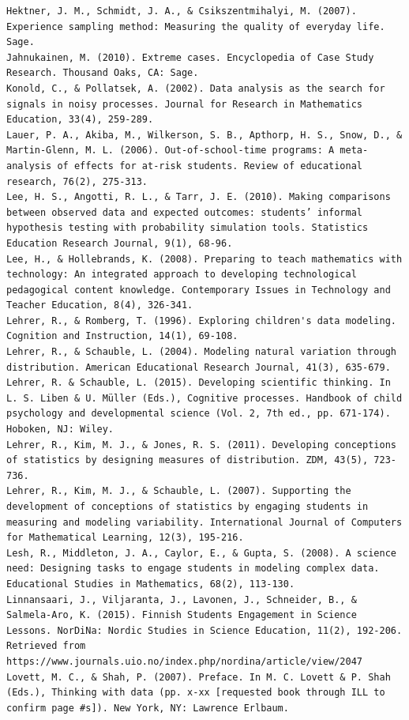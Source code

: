 \documentclass[]{book}
\theoremstyle{definition}
\theoremstyle{definition}
\theoremstyle{definition}
\theoremstyle{remark}
\begin{document}
\begin{verbatim}
Hektner, J. M., Schmidt, J. A., & Csikszentmihalyi, M. (2007). Experience sampling method: Measuring the quality of everyday life. Sage.  
Jahnukainen, M. (2010). Extreme cases. Encyclopedia of Case Study Research. Thousand Oaks, CA: Sage.
Konold, C., & Pollatsek, A. (2002). Data analysis as the search for signals in noisy processes. Journal for Research in Mathematics Education, 33(4), 259-289.  
Lauer, P. A., Akiba, M., Wilkerson, S. B., Apthorp, H. S., Snow, D., & Martin-Glenn, M. L. (2006). Out-of-school-time programs: A meta-analysis of effects for at-risk students. Review of educational research, 76(2), 275-313.  
Lee, H. S., Angotti, R. L., & Tarr, J. E. (2010). Making comparisons between observed data and expected outcomes: students’ informal hypothesis testing with probability simulation tools. Statistics Education Research Journal, 9(1), 68-96.  
Lee, H., & Hollebrands, K. (2008). Preparing to teach mathematics with technology: An integrated approach to developing technological pedagogical content knowledge. Contemporary Issues in Technology and Teacher Education, 8(4), 326-341.  
Lehrer, R., & Romberg, T. (1996). Exploring children's data modeling. Cognition and Instruction, 14(1), 69-108.  
Lehrer, R., & Schauble, L. (2004). Modeling natural variation through distribution. American Educational Research Journal, 41(3), 635-679.  
Lehrer, R. & Schauble, L. (2015). Developing scientific thinking. In L. S. Liben & U. Müller (Eds.), Cognitive processes. Handbook of child psychology and developmental science (Vol. 2, 7th ed., pp. 671-174). Hoboken, NJ: Wiley.  
Lehrer, R., Kim, M. J., & Jones, R. S. (2011). Developing conceptions of statistics by designing measures of distribution. ZDM, 43(5), 723-736.  
Lehrer, R., Kim, M. J., & Schauble, L. (2007). Supporting the development of conceptions of statistics by engaging students in measuring and modeling variability. International Journal of Computers for Mathematical Learning, 12(3), 195-216.  
Lesh, R., Middleton, J. A., Caylor, E., & Gupta, S. (2008). A science need: Designing tasks to engage students in modeling complex data. Educational Studies in Mathematics, 68(2), 113-130.  
Linnansaari, J., Viljaranta, J., Lavonen, J., Schneider, B., & Salmela-Aro, K. (2015). Finnish Students Engagement in Science Lessons. NorDiNa: Nordic Studies in Science Education, 11(2), 192-206. Retrieved from https://www.journals.uio.no/index.php/nordina/article/view/2047  
Lovett, M. C., & Shah, P. (2007). Preface. In M. C. Lovett & P. Shah (Eds.), Thinking with data (pp. x-xx [requested book through ILL to confirm page #s]). New York, NY: Lawrence Erlbaum.  

\end{verbatim}
\end{document}
